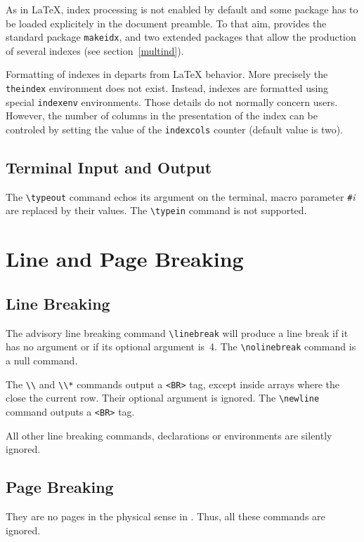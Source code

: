 As in \LaTeX, index processing is not enabled by default and
some  package has to be loaded explicitely in the
document preamble.
To that aim, \hevea{} provides the standard package \texttt{makeidx},
and two extended packages that allow the production of several indexes
(see section~\ref{multind}).

Formatting of indexes in \hevea{} departs from \LaTeX{} behavior.
More precisely the \verb+theindex+ environment does not exist.
Instead, indexes are formatted using special
\texttt{indexenv} environments.
Those details do not normally concern users.
However, the
number of columns in the presentation  of the index can be controled
by setting the value of the \texttt{indexcols} counter (default value
is two).

\subsection{Terminal Input and Output}

The \verb+\typeout+ command echos its argument on the
terminal, macro parameter \verb+#+\textit{i} are replaced by their values.
The \verb+\typein+ command is not supported.

\section{Line and Page Breaking}

\subsection{Line Breaking}
The advisory line breaking command \verb+\linebreak+
will produce a line break if it has no argument or if its optional
argument is~4.
The \verb+\nolinebreak+ command is a null command.


The \verb+\\+ and \verb+\\*+ commands output a \verb+<BR>+ tag,
except inside arrays where the close the current row.
Their optional argument is ignored.
The \verb+\newline+ command outputs a \verb+<BR>+ tag.

All other line breaking commands, declarations or environments are
silently ignored.

\subsection{Page Breaking}
They are no pages in the physical sense in \html. Thus, all these
commands are ignored.


